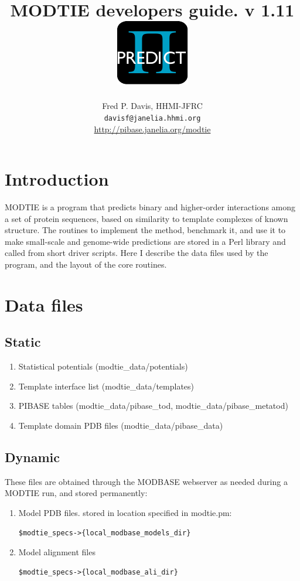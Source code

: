 \documentclass[11pt]{article}
\title{MODTIE developers guide. v 1.11\\
\includegraphics[scale=1]{modtie_logo.pdf}
}
\author{Fred P. Davis, HHMI-JFRC\\{\tt davisf@janelia.hhmi.org}\\\url{http://pibase.janelia.org/modtie}}
\begin{document}
\maketitle


\section*{Introduction}
MODTIE is a program that predicts binary and higher-order interactions among a set of protein sequences, based on similarity to template complexes of known structure. The routines to implement the method, benchmark it, and use it to make small-scale and genome-wide predictions are stored in a Perl library and called from short driver scripts. Here I describe the data files used by the program, and the layout of the core routines.

\tableofcontents

\section{Data files}

\subsection{Static}
\begin{enumerate}
   \item Statistical potentials (modtie\_data/potentials)
   \item Template interface list (modtie\_data/templates)
   \item PIBASE tables (modtie\_data/pibase\_tod, modtie\_data/pibase\_metatod)
   \item Template domain PDB files (modtie\_data/pibase\_data)
\end{enumerate}

\subsection{Dynamic}
These files are obtained through the MODBASE webserver as needed during a MODTIE run, and stored permanently:
\begin{enumerate}
   \item Model PDB files. stored in location specified in modtie.pm:
\lstset{breaklines=true,language=bash}
\lstset{frame=single}
\lstset{basicstyle=\ttfamily}
\begin{lstlisting}
$modtie_specs->{local_modbase_models_dir}
\end{lstlisting}

   \item Model alignment files
\lstset{breaklines=true,language=bash}
\lstset{frame=single}
\lstset{basicstyle=\ttfamily}
\begin{lstlisting}
$modtie_specs->{local_modbase_ali_dir}
\end{lstlisting}

\end{enumerate}
\end{document}
